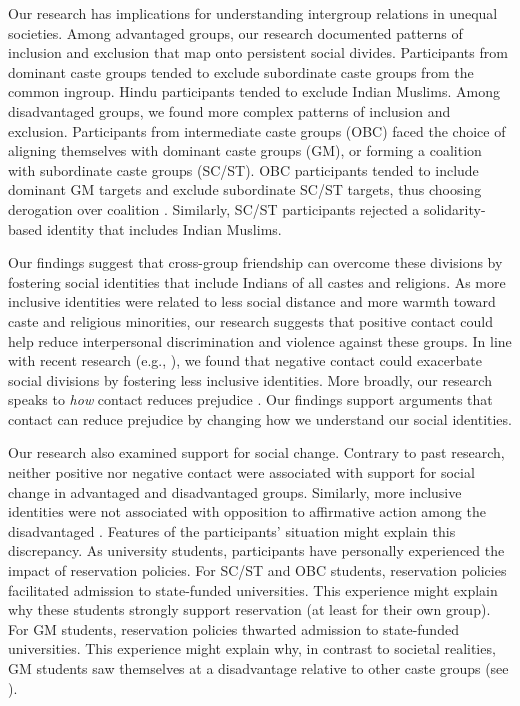 \documentclass[12pt, a4paper]{article}
\begin{document}
Our research has implications for understanding intergroup relations in unequal societies. Among advantaged groups, our research documented patterns of inclusion and exclusion that map onto persistent social divides. Participants from dominant caste groups tended to exclude subordinate caste groups from the common ingroup. Hindu participants tended to exclude Indian Muslims. Among disadvantaged groups, we found more complex patterns of inclusion and exclusion. Participants from intermediate caste groups (OBC) faced the choice of aligning themselves with dominant caste groups (GM), or forming a coalition with subordinate caste groups (SC/ST). OBC participants tended to include dominant GM targets and exclude subordinate SC/ST targets, thus choosing derogation over coalition \cite{craig_coalition_2012}. Similarly, SC/ST participants rejected a solidarity-based identity that includes Indian Muslims.

Our findings suggest that cross-group friendship can overcome these divisions by fostering social identities that include Indians of all castes and religions. As more inclusive identities were related to less social distance and more warmth toward caste and religious minorities, our research suggests that positive contact could help reduce interpersonal discrimination and violence against these groups. In line with recent research (e.g., ), we found that negative contact could exacerbate social divisions by fostering less inclusive identities. More broadly, our research speaks to \emph{how} contact reduces prejudice \cite{pettigrew_how_2008}. Our findings support arguments \cite{gaertner_reducing_2000, pettigrew_intergroup_1998} that contact can reduce prejudice by changing how we understand our social identities.

Our research also examined support for social change. Contrary to past research, neither positive nor negative contact \cite{reimer_intergroup_2017} were associated with support for social change in advantaged \cite{dixon_intergroup_2007} and disadvantaged \cite{dixon_beyond_2012} groups. Similarly, more inclusive identities were not associated with opposition to affirmative action among the disadvantaged \cite{dovidio_darker_2012}. Features of the participants' situation might explain this discrepancy. As university students, participants have personally experienced the impact of reservation policies. For SC/ST and OBC students, reservation policies facilitated admission to state-funded universities. This experience  might explain why these students strongly support reservation (at least for their own group). For GM students, reservation policies thwarted admission to state-funded universities. This experience might explain why, in contrast to societal realities, GM students saw themselves at a disadvantage relative to other caste groups (see ).
\end{document}
